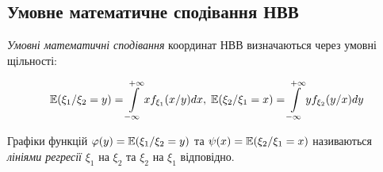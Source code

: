 \subsection{Умовне математичне сподівання НВВ}
\emph{Умовні математичні сподівання} координат НВВ визначаються через умовні щільності:

\begin{equation}\label{eq:cond_dens}
    \mathbb{E}(\xi_1 / \xi_2 = y) = \int\limits_{-\infty}^{+\infty} xf_{\xi_1}(x/y)dx, \;
    \mathbb{E}(\xi_2 / \xi_1 = x) = \int\limits_{-\infty}^{+\infty} yf_{\xi_2}(y/x)dy
\end{equation}

\begin{definition}
    Графіки функцій $\varphi(y) = \mathbb{E}(\xi_1 / \xi_2 = y)$ та 
    $\psi(x) = \mathbb{E}(\xi_2 / \xi_1 = x)$ називаються \emph{лініями регресії}
    $\xi_1$ на $\xi_2$ та $\xi_2$ на $\xi_1$ відповідно.
\end{definition}
